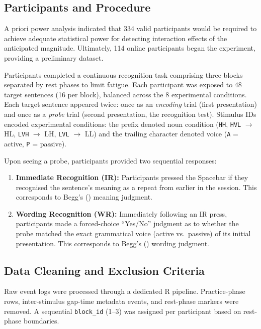 \documentclass[12pt, a4paper]{article}
\begin{document}
\subsection{Participants and Procedure}

A priori power analysis indicated that 334 valid participants would be required
to achieve adequate statistical power for detecting interaction effects of the
anticipated magnitude. Ultimately, 114 online participants began the experiment,
providing a preliminary dataset.

Participants completed a continuous recognition task comprising three blocks
separated by rest phases to limit fatigue. Each participant was exposed to 48
target sentences (16 per block), balanced across the 8 experimental conditions.
Each target sentence appeared twice: once as an \textit{encoding} trial (first
presentation) and once as a \textit{probe} trial (second presentation, the
recognition test). Stimulus IDs encoded experimental conditions: the prefix
denoted noun condition (\texttt{HH}, \texttt{HVL} $\to$ HL, \texttt{LVH} $\to$
LH, \texttt{LVL} $\to$ LL) and the trailing character denoted voice
(\texttt{A} = active, \texttt{P} = passive).

Upon seeing a probe, participants provided two sequential responses:
\begin{enumerate}
    \item \textbf{Immediate Recognition (IR):} Participants pressed the Spacebar
    if they recognised the sentence's meaning as a repeat from earlier in the
    session. This corresponds to Begg's (\citeyear{begg1971}) meaning judgment.
    \item \textbf{Wording Recognition (WR):} Immediately following an IR press,
    participants made a forced-choice ``Yes/No'' judgment as to whether the probe
    matched the exact grammatical voice (active vs.\ passive) of its initial
    presentation. This corresponds to Begg's (\citeyear{begg1971}) wording
    judgment.
\end{enumerate}

\subsection{Data Cleaning and Exclusion Criteria}

Raw event logs were processed through a dedicated R pipeline. Practice-phase
rows, inter-stimulus gap-time metadata events, and rest-phase markers were
removed. A sequential \texttt{block\_id} (1--3) was assigned per participant
based on rest-phase boundaries.
\end{document}
